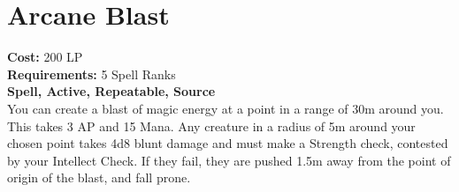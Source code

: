 \section{Arcane Blast}\label{spell:arcaneBlast}
\textbf{Cost:} 200 LP\\
\textbf{Requirements:} 5 Spell Ranks\\
\textbf{Spell, Active, Repeatable, Source}\\
You can create a blast of magic energy at a point in a range of 30m around you.
This takes 3 AP and 15 Mana.
Any creature in a radius of 5m around your chosen point takes 4d8 blunt damage and must make a Strength check, contested by your Intellect Check.
If they fail, they are pushed 1.5m away from the point of origin of the blast, and fall prone.
